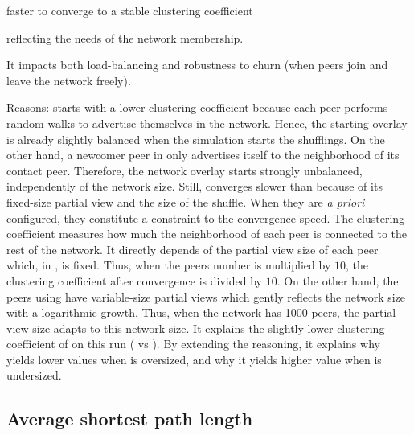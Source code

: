 \begin{asparadesc}
\begin{inparaenum}
  \item faster to converge to a stable clustering coefficient
  \item reflecting the needs of the network membership.
  \end{inparaenum}
  It impacts both load-balancing and robustness to churn (when peers join and
  leave the network freely).
\item[Reasons:] \CYCLON starts with a lower clustering coefficient because each
  peer performs random walks to advertise themselves in the network. Hence, the
  starting overlay is already slightly balanced when the simulation starts the
  shufflings. On the other hand, a newcomer peer in \SPRAY only advertises
  itself to the neighborhood of its contact peer. Therefore, the network
  overlay starts strongly unbalanced, independently of the network size. Still,
  \CYCLON converges slower than \SPRAY because of its fixed-size partial view
  and the size of the shuffle. When they are \emph{a priori} configured, they
  constitute a constraint to the convergence speed.  The clustering coefficient
  measures how much the neighborhood of each peer is connected to the rest of
  the network. It directly depends of the partial view size of each peer which,
  in \CYCLON, is fixed. Thus, when the peers number is multiplied by $10$, the
  clustering coefficient after convergence is divided by $10$. On the other
  hand, the peers using \SPRAY have variable-size partial views which gently
  reflects the network size with a logarithmic growth. Thus, when the network
  has 1000 peers, the partial view size adapts to this network size. It
  explains the slightly lower clustering coefficient of \SPRAY on this run
  ( vs ). By extending the reasoning, it explains why
  \SPRAY yields lower values when \CYCLON is oversized, and why it yields higher
  value when \CYCLON is undersized.
\end{asparadesc}

\subsection{Average shortest path length}
\label{subsec:avg}

